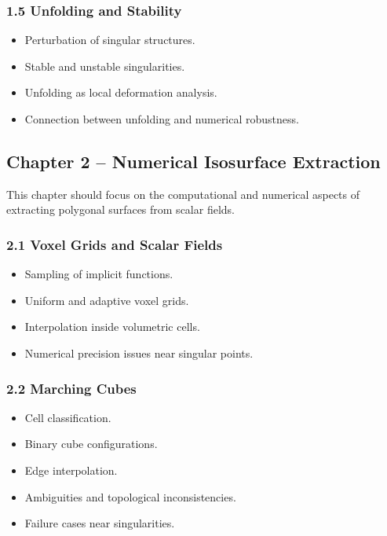 \documentclass[12pt,a4paper]{article}
\begin{document}
\subsubsection*{1.5 Unfolding and Stability}
\begin{itemize}
    \item Perturbation of singular structures.
    \item Stable and unstable singularities.
    \item Unfolding as local deformation analysis.
    \item Connection between unfolding and numerical robustness.
\end{itemize}

\subsection*{Chapter 2 -- Numerical Isosurface Extraction}

This chapter should focus on the computational and numerical aspects of extracting polygonal surfaces from scalar fields.

\subsubsection*{2.1 Voxel Grids and Scalar Fields}
\begin{itemize}
    \item Sampling of implicit functions.
    \item Uniform and adaptive voxel grids.
    \item Interpolation inside volumetric cells.
    \item Numerical precision issues near singular points.
\end{itemize}

\subsubsection*{2.2 Marching Cubes}
\begin{itemize}
    \item Cell classification.
    \item Binary cube configurations.
    \item Edge interpolation.
    \item Ambiguities and topological inconsistencies.
    \item Failure cases near singularities.
\end{itemize}
\end{document}
